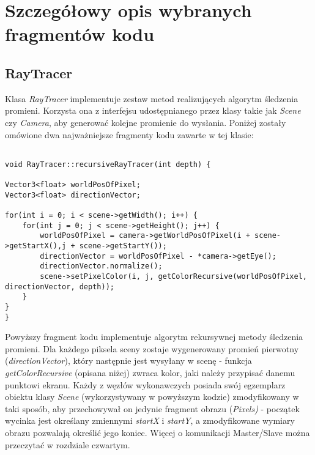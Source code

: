 \section{Szczegółowy opis wybranych fragmentów kodu}
	\subsection{RayTracer}

Klasa \emph{RayTracer} implementuje zestaw metod realizujących algorytm śledzenia promieni. Korzysta ona z interfejsu udostępnianego przez klasy takie jak \emph{Scene} czy \emph{Camera}, aby generować kolejne promienie do wysłania. Poniżej zostały omówione dwa najważniejsze fragmenty kodu zawarte w tej klasie:
	
\begin{lstlisting}[caption={Fragment klasy \emph{RayTracer}}]

void RayTracer::recursiveRayTracer(int depth) {

Vector3<float> worldPosOfPixel;
Vector3<float> directionVector;

for(int i = 0; i < scene->getWidth(); i++) {
    for(int j = 0; j < scene->getHeight(); j++) {
        worldPosOfPixel = camera->getWorldPosOfPixel(i + scene->getStartX(),j + scene->getStartY());
        directionVector = worldPosOfPixel - *camera->getEye();
        directionVector.normalize();
        scene->setPixelColor(i, j, getColorRecursive(worldPosOfPixel, directionVector, depth));
    }
}
}
\end{lstlisting}	

Powyższy fragment kodu implementuje algorytm rekursywnej metody śledzenia promieni. Dla każdego piksela sceny zostaje wygenerowany promień pierwotny (\emph{directionVector}), który następnie jest wysyłany w scenę - funkcja \emph{getColorRecursive} (opisana niżej) zwraca kolor, jaki należy przypisać danemu punktowi ekranu. Każdy z węzłów wykonawczych posiada swój egzemplarz obiektu klasy \emph{Scene} (wykorzystywany w powyższym kodzie) zmodyfikowany w taki sposób, aby przechowywał on jedynie fragment obrazu (\emph{Pixels)} - początek wycinka jest określany zmiennymi \emph{startX} i \emph{startY}, a zmodyfikowane wymiary obrazu pozwalają określić jego koniec. Więcej o komunikacji Master/Slave można przeczytać w rozdziale czwartym. 

